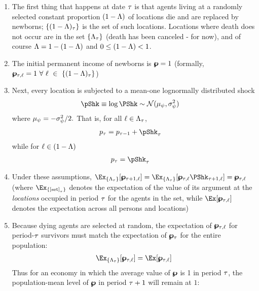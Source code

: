 \documentclass[\econtexRoot/BufferStockTheory.tex]{subfiles}
\begin{document}
\begin{enumerate}
\item The first thing that happens at date $\tau$ is that agents living at a randomly selected constant proportion $(1-\Lambda)$ of locations die and are replaced by newborns; $\{(1-\Lambda)_{\tau}\}$ is the set of such locations.  Locations where death does not occur are in the set  $\{\Lambda_{\tau}\}$ (death has been canceled - for now), and of course $\Lambda=1-(1-\Lambda)$ and $0 \leq (1-\Lambda) < 1$.

\item The initial permanent income of newborns is  $\pmb{\wp}=1$ (formally, $\pmb{\wp}_{\tau,\ell} = 1~\forall~\ell~\in~\{(1-\Lambda)_{\tau}\}$)
\item Next, every location is subjected to a mean-one lognormally distributed shock
  \begin{align}
    \pShk & \equiv \log \PShk \sim \mathcal{N}(\pShkMean,\sigma^{2}_{\DnsShk}) \label{eq:pShkDef}
  \end{align}
  where $\mu_{\psi} = -\sigma^{2}_{\psi}/2.$  That is, for all $\ell \in \Lambda_{\tau}$, 
  \begin{align}
    \pLog_{\tAbs} & = \pLog_{\tAbs-1}+\pShk_{\tAbs} \label{eq:pRandomwalk}
  \end{align}
  while for $\ell \in (1-\Lambda)$
  \begin{align}
    \pLog_{\tAbs} & = \pShk_{\tAbs} \label{eq:pStartsAtZero}
  \end{align}

  
\item Under these assumptions, $\Ex_{\{\Liv_{\tAbs}\}}[\pLev_{\tAbs+1,\posn}]=\Ex_{\{\Liv_{\tAbs}\}}[\pLev_{\tAbs,\posn}\PShk_{\tAbs+1,\posn}]=\pLev_{\tAbs,\posn}$ (where $\Ex_{\{\text{[set]}_{\tAbs}\}}$ denotes the expectation of the value of its argument at the \emph{locations} occupied in period $\tau$ for the agents in the set, while  $\Ex[\pLev_{\tAbs,\posn}]$ denotes the expectation across all persons and locations)      
\item Because dying agents are selected at random, the expectation of $\pmb{\wp}_{\tau,\ell}$ for period-$\tau$ survivors must match the expectation of $\pmb{\wp}_{\tau}$ for the entire population:
  \begin{align}
    \Ex_{\{\Liv_{\tAbs}\}}[\pLev_{\tAbs,\posn}]=\Ex[\pLev_{\tAbs,\posn}] \label{eq:pLevLivIsOne}
  \end{align}
  Thus for an economy in which the average value of $\pmb{\wp}$ is 1 in period $\tau$, the population-mean level of $\pmb{\wp}$ in period $\tau+1$ will remain at $1$:
  
\end{enumerate}
\end{document}
